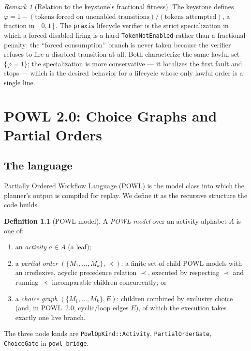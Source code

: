 \documentclass[11pt,oneside]{book}
\theoremstyle{definition}
\newtheorem{definition}{Definition}[chapter]
\theoremstyle{plain}
\theoremstyle{remark}
\newtheorem*{remark}{Remark}
\newcommand{\Fitness}{\varphi}
\newcommand{\code}[1]{\texttt{#1}}
\begin{document}
\begin{remark}[Relation to the keystone's fractional fitness]
The keystone defines $\Fitness=1-(\text{tokens forced on unenabled transitions})/(\text{tokens
attempted})$, a fraction in $[0,1]$. The \code{praxis} lifecycle verifier is the strict
specialization in which a forced-disabled firing is a hard \code{TokenNotEnabled} rather than a
fractional penalty: the ``forced consumption'' branch is never taken because the verifier
refuses to fire a disabled transition at all. Both characterize the same lawful set
$\{\Fitness=1\}$; the specialization is more conservative --- it localizes the first fault and
stops --- which is the desired behavior for a lifecycle whose only lawful order is a single
line.
\end{remark}

\chapter{POWL 2.0: Choice Graphs and Partial Orders}
\label{ch:powl}

\section{The language}

Partially Ordered Workflow Language (POWL) \cite{powl2023} is the model class into which the
planner's output is compiled for replay. We define it as the recursive structure the code
builds.

\begin{definition}[POWL model]\label{def:powl}
A \emph{POWL model} over an activity alphabet $A$ is one of:
\begin{enumerate}[label=(\roman*),leftmargin=*]
\item an \emph{activity} $a\in A$ (a leaf);
\item a \emph{partial order} $(\{M_1,\dots,M_k\},\prec)$: a finite set of child POWL models
      with an irreflexive, acyclic precedence relation $\prec$, executed by respecting $\prec$
      and running $\prec$-incomparable children concurrently; or
\item a \emph{choice graph} $(\{M_1,\dots,M_k\},E)$: children combined by exclusive choice
      (and, in POWL~2.0, cyclic/loop edges $E$), of which the execution takes exactly one live
      branch.
\end{enumerate}
The three node kinds are \code{PowlOpKind::Activity}, \code{PartialOrderGate},
\code{ChoiceGate} in \code{powl\_bridge}.
\end{definition}
\end{document}
